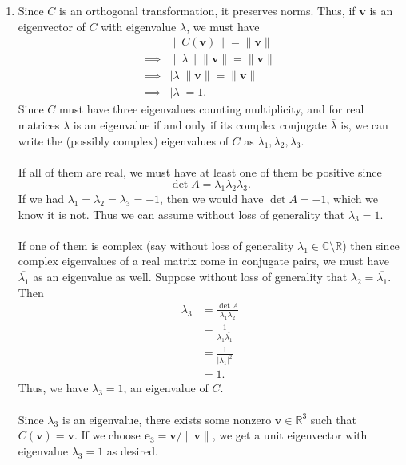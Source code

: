 \documentclass[12 pt, letterpaper]{hmcpset}
\begin{document}
\begin{solution}
	\begin{enumerate}
		\item Since $C$ is an orthogonal transformation, it preserves norms. Thus, if $\mathbf{v}$ is an eigenvector of $C$ with eigenvalue $\lambda$, we must have
			\[
				\begin{split}
					& \lVert C(\mathbf{v}) \rVert = \lVert \mathbf{v} \rVert \\
					\implies & \lVert \lambda \rVert \lVert \mathbf{v} \rVert = \lVert \mathbf{v} \rVert \\
					\implies & \lvert \lambda \rvert \lVert \mathbf{v} \rVert = \lVert \mathbf{v} \rVert \\
					\implies & \lvert \lambda \rvert = 1. 
				\end{split}
			\]
			Since $C$ must have three eigenvalues counting multiplicity, and for real matrices $\lambda$ is an eigenvalue if and only if its complex conjugate $\overline{\lambda}$ is, we can write the (possibly complex) eigenvalues of $C$ as $\lambda_{1}, \lambda_{2}, \lambda_{3}$. \\\\
			If all of them are real, we must have at least one of them be positive since
			\[
				\det A = \lambda_{1} \lambda_{2} \lambda_{3}.
			\]
			If we had $\lambda_{1} = \lambda_{2} = \lambda_{3} = -1$, then we would have $\det A = -1$, which we know it is not. Thus we can assume without loss of generality that $\lambda_{3} = 1$. \\\\
			If one of them is complex (say without loss of generality $\lambda_{1} \in \mathbb{C} \setminus \mathbb{R}$) then since complex eigenvalues of a real matrix come in conjugate pairs, we must have $\overline{\lambda_{1}}$ as an eigenvalue as well. Suppose without loss of generality that $\lambda_{2} = \overline{\lambda_{1}}$. Then
			\[
				\begin{split}
					\lambda_{3} & = \frac{\det A}{\lambda_{1} \lambda_{2}} \\
						    & = \frac{1}{\lambda_{1} \overline{\lambda_{1}}} \\
						    & = \frac{1}{\lvert \lambda_{1} \rvert^{2}} \\
						    & = 1.
				\end{split}
			\]
			Thus, we have $\lambda_{3} = 1$, an eigenvalue of $C$. \\\\
			Since $\lambda_{3}$ is an eigenvalue, there exists some nonzero $\mathbf{v} \in \mathbb{R}^{3}$ such that $C(\mathbf{v}) = \mathbf{v}$. If we choose $\mathbf{e}_{3} = \mathbf{v}/\lVert \mathbf{v} \rVert$, we get a unit eigenvector with eigenvalue $\lambda_{3} = 1$ as desired.

\end{enumerate}
\end{solution}
\end{document}
